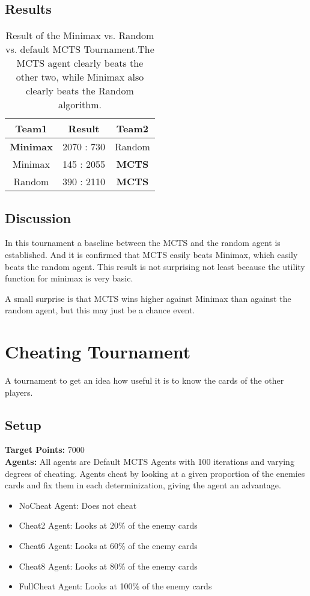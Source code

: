 \subsection*{Results}
\begin{table}[h!]
  \centering

  \begin{tabular}{ccc}
    \textbf{Team1} & \textbf{Result}  & \textbf{Team2}\\
    \hline
    \textbf{Minimax} & 2070 : 730  & Random\\
    \hline
    Minimax & 145  : 2055 & \textbf{MCTS}\\
    \hline
    Random & 390  : 2110 & \textbf{MCTS}\\
    \hline
  \end{tabular}
  \caption[Result of the Minimax vs. Random vs. default MCTS Tournament]{Result of the Minimax vs. Random vs. default MCTS Tournament.\newline The MCTS agent clearly beats the other two, while Minimax also clearly beats the Random algorithm.}
\end{table}

\subsection*{Discussion}
In this tournament a baseline between the MCTS and the random agent is established. And it is confirmed that MCTS easily beats Minimax, which easily beats the random agent.
This result is not surprising not least because the utility function for minimax is very basic.

A small surprise is that MCTS wins higher against Minimax than against the random agent, but this may just be a chance event.


\section{Cheating Tournament}
\label{sec:cheatexp}
A tournament to get an idea how useful it is to know the cards of the other players.
\subsection*{Setup}
\textbf{Target Points:} 7000\\
\textbf{Agents:}
All agents are Default MCTS Agents with 100 iterations and varying degrees of cheating.
Agents cheat by looking at a given proportion of the enemies cards and fix them in each determinization, giving the agent an advantage.
\begin{itemize}
    \setlength\itemsep{2px}
    \item NoCheat Agent: Does not cheat
    \item Cheat2 Agent: Looks at 20\% of the enemy cards
    \item Cheat6 Agent: Looks at 60\% of the enemy cards
    \item Cheat8 Agent: Looks at 80\% of the enemy cards
    \item FullCheat Agent: Looks at 100\% of the enemy cards
\end{itemize}

